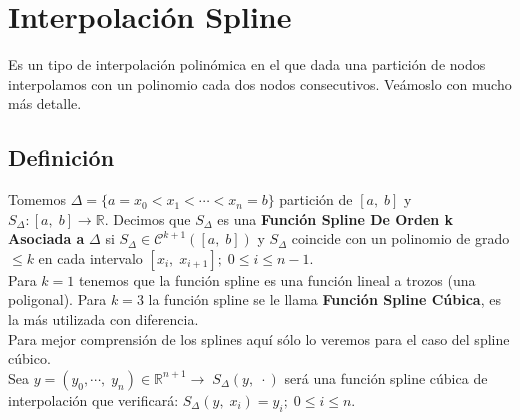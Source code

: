 \documentclass[12pt,a4paper,oneside]{scrbook}
\newcounter{ns}
\begin{document}
\section{Interpolación Spline}
Es un tipo de interpolación polinómica en el que dada una partición de nodos interpolamos con un polinomio cada dos nodos consecutivos. Veámoslo con mucho más detalle.
\subsection*{Definición}
Tomemos $\Delta = \{ a=x_0<x_1<\cdots <x_n=b \}$ partición de $[a,\;b]$ y $S_\Delta :[a,\;b]\longrightarrow\mathbb{R}$. Decimos que $S_\Delta$ es una \textbf{Función Spline De Orden k Asociada a } $\Delta$ si $S_\Delta \in\mathcal{C}^{k+1} ([a,\;b])$ y $S_\Delta$ coincide con un polinomio de grado $\leq k$ en cada intervalo $[x_i,\;x_{i+1}];\;0\leq i\leq n-1$.\\
Para $k=1$ tenemos que la función spline es una función lineal a trozos (una poligonal). Para $k=3$ la función spline se le llama \textbf{Función Spline Cúbica}, es la más utilizada con diferencia.\\
Para mejor comprensión de los splines aquí sólo lo veremos para el caso del spline cúbico.\\
Sea $y=(y_0,\cdots ,\; y_n)\in\mathbb{R}^{n+1}\longrightarrow\;S_\Delta (y,\;\cdot )$ será una función spline cúbica de interpolación que verificará: $S_\Delta (y,\; x_i)=y_i;\; 0\leq i\leq n$.
\end{document}
